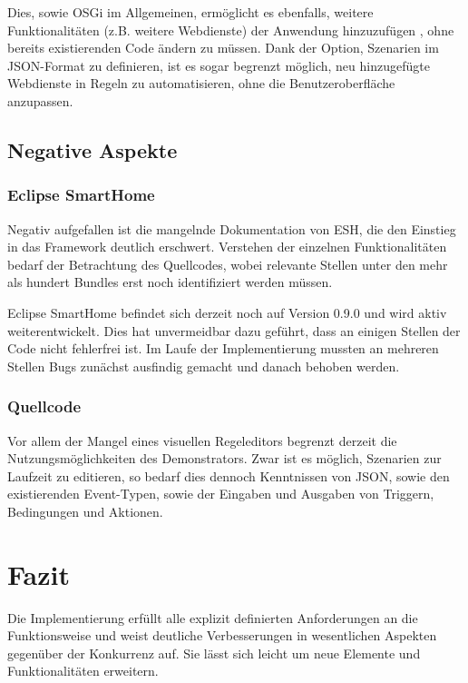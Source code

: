 Dies, sowie OSGi im Allgemeinen, ermöglicht es ebenfalls, weitere Funktionalitäten (z.B. weitere Webdienste) der Anwendung hinzuzufügen , ohne bereits existierenden Code ändern zu müssen. Dank der Option, Szenarien im JSON-Format zu definieren, ist es sogar begrenzt möglich, neu hinzugefügte Webdienste in Regeln zu automatisieren, ohne die Benutzeroberfläche anzupassen.

\subsection{Negative Aspekte}
\subsubsection{Eclipse SmartHome}
Negativ aufgefallen ist die mangelnde Dokumentation von ESH, die den Einstieg in das Framework deutlich erschwert. Verstehen der einzelnen Funktionalitäten bedarf der Betrachtung des Quellcodes, wobei relevante Stellen unter den mehr als hundert Bundles erst noch identifiziert werden müssen. 

Eclipse SmartHome befindet sich derzeit noch auf Version 0.9.0 und wird aktiv weiterentwickelt. Dies hat unvermeidbar dazu geführt, dass an einigen Stellen der Code nicht fehlerfrei ist. Im Laufe der Implementierung mussten an mehreren Stellen Bugs zunächst ausfindig gemacht und danach behoben werden.

\subsubsection{Quellcode}
Vor allem der Mangel eines visuellen Regeleditors begrenzt derzeit die Nutzungsmöglichkeiten des Demonstrators. Zwar ist es möglich, Szenarien zur Laufzeit zu editieren, so bedarf dies dennoch Kenntnissen von JSON, sowie den existierenden Event-Typen, sowie der Eingaben und Ausgaben von Triggern, Bedingungen und Aktionen.

\section{Fazit}
Die Implementierung erfüllt alle explizit definierten Anforderungen an die Funktionsweise und weist deutliche Verbesserungen in wesentlichen Aspekten gegenüber der Konkurrenz auf. Sie lässt sich leicht um neue Elemente und Funktionalitäten erweitern.


